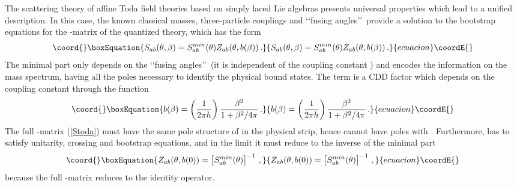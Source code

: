 \documentclass[a4paper,12pt]{report}
\begin{document}
\vspace{1cm}


The scattering theory of affine Toda field theories based on simply laced Lie algebras presents universal
properties which lead to a unified description. In this case, the known classical masses, three-particle
couplings and \lq\lq fusing angles\rq\rq\, provide a solution to the bootstrap equations for the \coordHE{}-matrix of
the quantized theory, which has the form
\begin{equation}\coord{}\boxEquation{\label{Stoda}
S_{ab}(\theta,\beta)=S_{ab}^{min}(\theta)Z_{ab}(\theta,b(\beta))\,.
}{S_{ab}(\theta,\beta)=S_{ab}^{min}(\theta)Z_{ab}(\theta,b(\beta))\,.
}{ecuacion}\coordE{}\end{equation}
The minimal part \coordHE{} only depends on the \lq\lq fusing angles\rq\rq\, \coordHE{} (it is
independent of the coupling constant \myHighlight{$\beta$}\coordHE{}) and encodes the information on the mass spectrum, having all the
poles necessary to identify the physical bound states. The term \coordHE{} is a CDD factor which depends on the
coupling constant \myHighlight{$\beta$}\coordHE{} through the function
\begin{equation}\coord{}\boxEquation{
b(\beta)=\left(\frac{1}{2\pi h}\right)\frac{\beta^{2}}{1+\beta^{2}/4\pi}\,.
}{
b(\beta)=\left(\frac{1}{2\pi h}\right)\frac{\beta^{2}}{1+\beta^{2}/4\pi}\,.
}{ecuacion}\coordE{}\end{equation}
The full \coordHE{}-matrix (\ref{Stoda}) must have the same pole structure of \coordHE{} in the physical strip,
hence \coordHE{} cannot have poles with \coordHE{}. Furthermore, \coordHE{} has to satisfy
unitarity, crossing and bootstrap equations, and in the limit \coordHE{} it must reduce to the inverse
of the minimal part
\begin{equation}\coord{}\boxEquation{
Z_{ab}(\theta,b(0))=\left[S_{ab}^{min}(\theta)\right]^{-1}\,,
}{
Z_{ab}(\theta,b(0))=\left[S_{ab}^{min}(\theta)\right]^{-1}\,,
}{ecuacion}\coordE{}\end{equation}
because the full \coordHE{}-matrix reduces to the identity operator.
\end{document}
